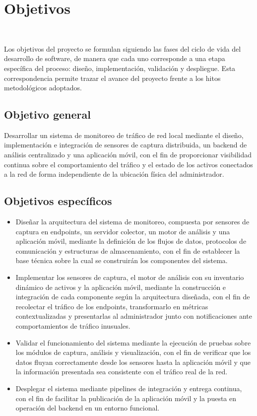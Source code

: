 \section{Objetivos}
~\label{sec:objetivos}

Los objetivos del proyecto se formulan siguiendo las fases del ciclo 
de vida del desarrollo de software, de manera que cada uno corresponde 
a una etapa específica del proceso: diseño, implementación, validación 
y despliegue. Esta correspondencia permite trazar el avance del 
proyecto frente a los hitos metodológicos adoptados.

\subsection{Objetivo general}

Desarrollar un sistema de monitoreo de tráfico de red local mediante 
el diseño, implementación e integración de sensores de captura 
distribuida, un backend de análisis centralizado y una aplicación 
móvil, con el fin de proporcionar visibilidad continua sobre el 
comportamiento del tráfico y el estado de los activos conectados a la 
red de forma independiente de la ubicación física del administrador.

\subsection{Objetivos específicos}

\begin{itemize}
    \item Diseñar la arquitectura del sistema de monitoreo, compuesta 
    por sensores de captura en endpoints, un servidor colector, un 
    motor de análisis y una aplicación móvil, mediante la definición 
    de los flujos de datos, protocolos de comunicación y estructuras 
    de almacenamiento, con el fin de establecer la base técnica sobre 
    la cual se construirán los componentes del sistema.

    \item Implementar los sensores de captura, el motor de análisis 
    con su inventario dinámico de activos y la aplicación móvil, 
    mediante la construcción e integración de cada componente según 
    la arquitectura diseñada, con el fin de recolectar el tráfico de 
    los endpoints, transformarlo en métricas contextualizadas y 
    presentarlas al administrador junto con notificaciones ante 
    comportamientos de tráfico inusuales.

    \item Validar el funcionamiento del sistema mediante la ejecución 
    de pruebas sobre los módulos de captura, análisis y visualización, 
    con el fin de verificar que los datos fluyan correctamente desde 
    los sensores hasta la aplicación móvil y que la información 
    presentada sea consistente con el tráfico real de la red.

    \item Desplegar el sistema mediante pipelines de integración y 
    entrega continua, con el fin de facilitar la publicación de la 
    aplicación móvil y la puesta en operación del backend en un 
    entorno funcional.
\end{itemize}